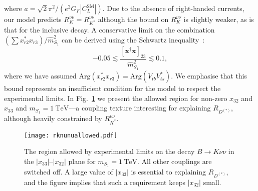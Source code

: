 where $a = \sqrt{2} \pi^2 / (e^2 G_F |C_L^{\text{SM}}|)$. Due to the absence of
right-handed currents, our model predicts $R_K^{\nu\nu} = R_{K^{*}}^{\nu\nu}$
although the bound on $R_{K}^{\nu\nu}$ is slightly weaker, as is that for
the inclusive decay. A conservative limit on the combination
$(\sum x^*_{r 2} x_{r 3})/\hat{m}^2_{S_{1}}$ can be derived using the Schwartz
inequality~\cite{Bauer:2015knc}:
\begin{equation} \label{eq:ch3-bnunucond}
  -0.05 \lesssim \frac{[\mathbf{x}^\dagger \mathbf{x}]_{23}}{\hat{m}^2_{S_{1}}} \lesssim 0.1,
\end{equation}
where we have assumed $\text{Arg}(x_{r2}^*x_{r3}) = \text{Arg}(V_{tb}V_{ts}^*)$.
We emphasise that this bound represents an insufficient condition for the model
to respect the experimental limits. In Fig.~\ref{fig:ch3-rknunuallowed} we present
the allowed region for non-zero $x_{32}$ and $x_{33}$ and $m_{S_{1}} = \SI{1}{\TeV}$---a coupling texture interesting for explaining $R_{D^{(*)}}$, although
heavily constrained by $R_{K^{*}}^{\nu\nu}$.

\begin{figure}[t]
  \centering \texttt{[image: rknunuallowed.pdf]}
  \caption[The region allowed by experimental limits on the decay
  $B \to K^{*} \nu \nu$ in the $|x_{33}|$--$|x_{32}|$ plane for $m_{S_{1}} = \SI{1}{\TeV}$.]{The region allowed by experimental limits on the decay
    $B \to K \nu \nu$ in the $|x_{33}|$--$|x_{32}|$ plane for $m_{S_{1}} = \SI{1}{\TeV}$. All other couplings are switched off. A large value of $|x_{33}|$
    is essential to explaining $R_{D^{(*)}}$, and the figure implies that such a
    requirement keeps $|x_{32}|$ small.}
  \label{fig:ch3-rknunuallowed}
\end{figure}

